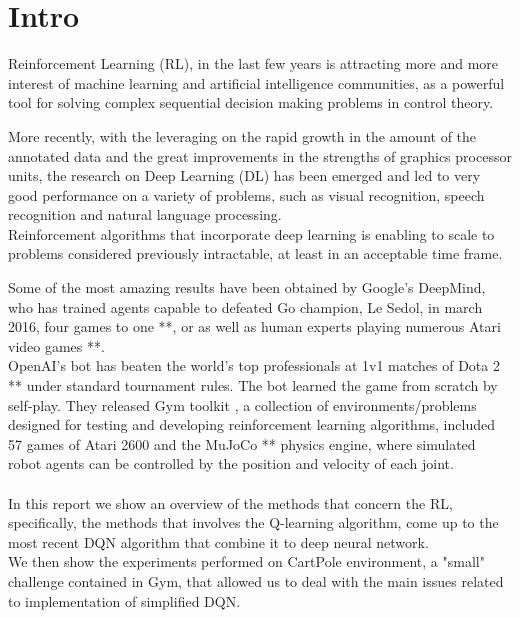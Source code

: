 \section{Intro}

\noindent 
Reinforcement Learning (RL), in the last few years is attracting more and more interest of machine learning and artificial intelligence communities, as a powerful tool for solving complex sequential decision making problems in control theory.

More recently, with the leveraging on the rapid growth in the amount of the annotated data and the great improvements in the strengths of graphics processor units, the research on  Deep Learning (DL) has been emerged and led to very good performance on a variety of problems, such as visual recognition, speech recognition and natural language processing.
\\Reinforcement algorithms that incorporate deep learning is enabling to scale to problems considered previously intractable, at least in an acceptable time frame.

Some of the most amazing results have been obtained by Google’s DeepMind, who has trained agents capable to defeated Go champion, Le Sedol, in march 2016, four games to one **, or as well as human experts playing numerous Atari video games **.
\\OpenAI's bot has beaten the world's top professionals at 1v1 matches of Dota 2 ** under standard tournament rules. The bot learned the game from scratch by self-play.
They released Gym toolkit \cite{Gym}, a collection of environments/problems designed for testing and developing reinforcement learning algorithms, included 57 games of Atari 2600 and the MuJoCo ** physics engine, where simulated robot agents can be controlled by the position and velocity of each joint. 
\\\\
In this report we show an overview of the methods that concern the RL, specifically, the methods that involves the Q-learning algorithm, come up to the most recent DQN algorithm that combine it to deep neural network.
\\We then show the experiments performed on CartPole environment, a "small" challenge contained in Gym, that allowed us to deal with the main issues related to implementation of simplified DQN.
